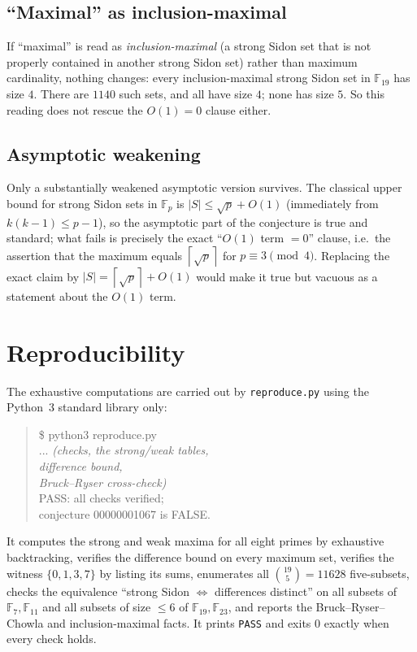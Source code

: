 \documentclass[11pt]{article}
\theoremstyle{definition}
\theoremstyle{remark}
\newcommand{\F}{\mathbb{F}}
\newcommand{\ceil}[1]{\left\lceil #1 \right\rceil}
\begin{document}
\subsection*{``Maximal'' as inclusion-maximal}

If ``maximal'' is read as \emph{inclusion-maximal} (a strong Sidon set that is
not properly contained in another strong Sidon set) rather than maximum
cardinality, nothing changes: every inclusion-maximal strong Sidon set in
$\F_{19}$ has size $4$. There are $1140$ such sets, and all have size $4$;
none has size $5$. So this reading does not rescue the $O(1) = 0$ clause
either.

\subsection*{Asymptotic weakening}

Only a substantially weakened asymptotic version survives. The classical
upper bound for strong Sidon sets in $\F_p$ is $|S| \le \sqrt p + O(1)$
(immediately from $k(k-1) \le p-1$), so the asymptotic part of the conjecture
is true and standard; what fails is precisely the exact ``$O(1)$ term $= 0$''
clause, i.e.\ the assertion that the maximum equals $\ceil{\sqrt p}$ for
$p \equiv 3 \pmod 4$. Replacing the exact claim by $|S| = \ceil{\sqrt p} +
O(1)$ would make it true but vacuous as a statement about the $O(1)$ term.

\section{Reproducibility}

The exhaustive computations are carried out by \texttt{reproduce.py} using the
Python~3 standard library only:

\begin{quote}\small\ttfamily
\$ python3 reproduce.py\\
... \textit{(checks, the strong/weak tables,}\\
\hspace*{1.5em}\textit{difference bound,}\\
\hspace*{1.5em}\textit{Bruck--Ryser cross-check)}\\
PASS: all checks verified;\\
\hspace*{1.5em}conjecture 00000001067 is FALSE.
\end{quote}

It computes the strong and weak maxima for all eight primes by exhaustive
backtracking, verifies the difference bound on every maximum set, verifies the
witness $\{0,1,3,7\}$ by listing its sums, enumerates all $\binom{19}{5} =
11628$ five-subsets, checks the equivalence ``strong Sidon $\Leftrightarrow$
differences distinct'' on all subsets of $\F_7, \F_{11}$ and all subsets of
size $\le 6$ of $\F_{19}, \F_{23}$, and reports the Bruck--Ryser--Chowla and
inclusion-maximal facts. It prints \texttt{PASS} and exits $0$ exactly when
every check holds.
\end{document}
